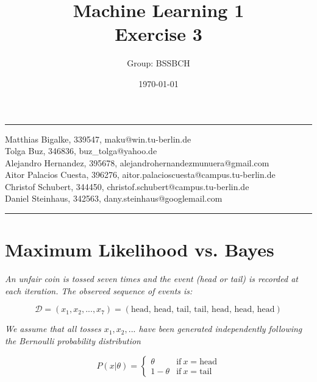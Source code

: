 \documentclass{article}
\title{Machine Learning 1 \\ Exercise 3} %
\author{Group: BSSBCH} %
\date{\today} %
\begin{document}
\maketitle %
\noindent\rule[0.5ex]{\linewidth}{1pt}
Matthias Bigalke, 339547, maku@win.tu-berlin.de \\
Tolga Buz, 346836, buz\_tolga@yahoo.de \\
Alejandro Hernandez, 395678, alejandrohernandezmunuera@gmail.com \\
Aitor Palacios Cuesta, 396276, aitor.palacioscuesta@campus.tu-berlin.de \\
Christof Schubert, 344450, christof.schubert@campus.tu-berlin.de \\
Daniel Steinhaus, 342563, dany.steinhaus@googlemail.com\\
\noindent\rule[0.5ex]{\linewidth}{1pt}


\section{Maximum Likelihood vs. Bayes}

\textit{An unfair coin is tossed seven times and the event (head or tail) is recorded at each iteration.  The observed sequence of events is:}

\begin{equation}
\mathcal{D} = (x_1, x_2, ... , x_7) = (\text{head, head, tail, tail, head, head, head})
\end{equation}

\textit{We assume that all tosses $x_1, x_2, ...$ have been generated independently following the Bernoulli probability distribution}

\begin{equation}
P(x|\theta) = \left\{
\begin{array}{ll} \theta 	& \text{if} ~ x = \text{head}\\
  			   1 - \theta &  \text{if} ~ x = \text{tail}
\end{array}\right.
\end{equation}
\end{document}
